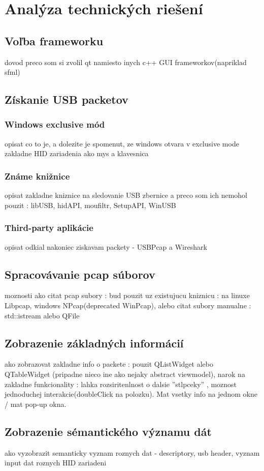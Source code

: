\chapter{Analýza technických riešení}
\section{Voľba frameworku}
dovod preco som si zvolil qt namiesto inych c++ GUI frameworkov(napriklad sfml)
\section{Získanie USB packetov}
\subsection{Windows exclusive mód}
opisat co to je, a dolezite je spomenut, ze windows otvara v exclusive mode zakladne HID zariadenia ako mys a klavesnica
\subsection{Známe knižnice}
opisat zakladne kniznice na sledovanie USB zbernice a preco som ich nemohol pouzit : libUSB, hidAPI, moufiltr, SetupAPI, WinUSB
\subsection{Third-party aplikácie}
opisat odkial nakoniec ziskavam packety - USBPcap a Wireshark
\section{Spracovávanie pcap súborov}
moznosti ako citat pcap subory : bud pouzit uz existujucu kniznicu : na linuxe Libpcap, windows NPcap(deprecated WinPcap), alebo citat subory manualne : std::istream alebo QFile
\section{Zobrazenie základných informácií}
ako zobrazovat zakladne info o packete : pouzit QListWidget alebo QTableWidget (pripadne nieco ine ako nejaky abstract viewmodel), narok na zakladne funkcionality : lahka rozsiritenlnost o dalsie ''stlpceky'' , moznost jednoduchej interakcie(doubleClick na polozku). Mat vsetky info na jednom okne / mat pop-up okna.
\section{Zobrazenie sémantického významu dát}
ako vyzobrazit semanticky vyznam roznych dat - descriptory, usb header, vyznam input dat roznych HID zariadeni
